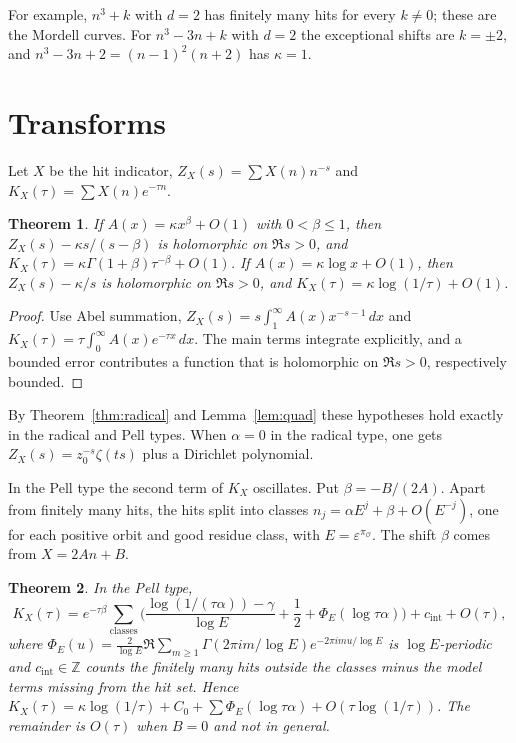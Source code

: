 \documentclass[11pt]{amsart}
\newtheorem{theorem}{Theorem}[section]
\theoremstyle{definition}
\theoremstyle{remark}
\newcommand{\Z}{\mathbb{Z}}
\begin{document}
For example, $n^3+k$ with $d=2$ has finitely many hits for every $k\neq0$; these are the Mordell curves. For $n^3-3n+k$ with $d=2$ the exceptional shifts are $k=\pm2$, and $n^3-3n+2=(n-1)^2(n+2)$ has $\kappa=1$.

\section{Transforms}\label{sec:transforms}

Let $X$ be the hit indicator, $Z_X(s)=\sum X(n)n^{-s}$ and $K_X(\tau)=\sum X(n)e^{-\tau n}$.

\begin{theorem}\label{thm:transforms}
If $A(x)=\kappa x^\beta+O(1)$ with $0<\beta\le1$, then $Z_X(s)-\kappa s/(s-\beta)$ is holomorphic on $\Re s>0$, and $K_X(\tau)=\kappa\Gamma(1+\beta)\tau^{-\beta}+O(1)$. If $A(x)=\kappa\log x+O(1)$, then $Z_X(s)-\kappa/s$ is holomorphic on $\Re s>0$, and $K_X(\tau)=\kappa\log(1/\tau)+O(1)$.
\end{theorem}

\begin{proof}
Use Abel summation, $Z_X(s)=s\int_1^\infty A(x)x^{-s-1}\,dx$ and $K_X(\tau)=\tau\int_0^\infty A(x)e^{-\tau x}\,dx$. The main terms integrate explicitly, and a bounded error contributes a function that is holomorphic on $\Re s>0$, respectively bounded.
\end{proof}

By Theorem~\ref{thm:radical} and Lemma~\ref{lem:quad} these hypotheses hold exactly in the radical and Pell types. When $\alpha=0$ in the radical type, one gets $Z_X(s)=z_0^{-s}\zeta(ts)$ plus a Dirichlet polynomial.

In the Pell type the second term of $K_X$ oscillates. Put $\beta=-B/(2A)$. Apart from finitely many hits, the hits split into classes $n_j=\alpha E^j+\beta+O(E^{-j})$, one for each positive orbit and good residue class, with $E=\varepsilon^{\pi_{\mathcal O}}$. The shift $\beta$ comes from $X=2An+B$.

\begin{theorem}\label{thm:T2}
In the Pell type,
\[
K_X(\tau)=e^{-\tau\beta}\sum_{\text{classes}}\Big(\frac{\log(1/(\tau\alpha))-\gamma}{\log E}+\frac12+\Phi_E(\log\tau\alpha)\Big)+c_{\mathrm{int}}+O(\tau),
\]
where $\Phi_E(u)=\frac{2}{\log E}\Re\sum_{m\ge1}\Gamma(2\pi im/\log E)e^{-2\pi imu/\log E}$ is $\log E$-periodic and $c_{\mathrm{int}}\in\Z$ counts the finitely many hits outside the classes minus the model terms missing from the hit set. Hence $K_X(\tau)=\kappa\log(1/\tau)+C_0+\sum\Phi_E(\log\tau\alpha)+O(\tau\log(1/\tau))$. The remainder is $O(\tau)$ when $B=0$ and not in general.
\end{theorem}
\end{document}
